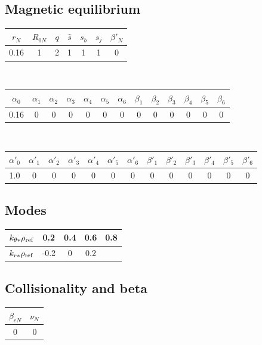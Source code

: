 \documentclass[fleqn]{report}
\begin{document}
\subsection{Magnetic equilibrium}
\begin{tabular}{c c c c c c c}
\hline
$r_N$ & $R_{0N}$ & $q$ & $\hat{s}$ & $s_b$ & $s_j$ & $\beta'_N$ \\ [0.5ex]
\hline
0.16 & 1 & 2 & 1 & 1 & 1 & 0 \\
\hline
\end{tabular}\\
\begin{tabular}{c c c c c c c c c c c c c}
\hline
$\alpha_0$ & $\alpha_1$ & $\alpha_2$ & $\alpha_3$ & $\alpha_4$ & $\alpha_5$ & $\alpha_6$ 
& $\beta_1$ & $\beta_2$ & $\beta_3$ & $\beta_4$ & $\beta_5$ & $\beta_6$   \\ [0.5ex]
\hline
 0.16 & 0 & 0 & 0 & 0 & 0 & 0 & 0 & 0 & 0 & 0 & 0 & 0 \\
\hline
\end{tabular}\\
\begin{tabular}{c c c c c c c c c c c c c}
\hline
$\alpha'_0$ & $\alpha'_1$ & $\alpha'_2$ & $\alpha'_3$ & $\alpha'_4$ & $\alpha'_5$ & $\alpha'_6$ 
& $\beta'_1$ & $\beta'_2$ & $\beta'_3$ & $\beta'_4$ & $\beta'_5$ & $\beta'_6$   \\ [0.5ex]
\hline
1.0 & 0 & 0 & 0 & 0 & 0  & 0 & 0 & 0 & 0  & 0 & 0 & 0 \\
\hline
\end{tabular}

\subsection{Modes}
\begin{tabular}{c c c c c}
\hline
$k_{\theta*}\rho_{\textrm{ref}}$ & 0.2 & 0.4 & 0.6 & 0.8 \\ [0.5ex]
\hline
$k_{r*}\rho_{\textrm{ref}}$ & -0.2 & 0  & 0.2  &  \\ [0.5ex]
\hline
\end{tabular}

\subsection{Collisionality and beta}
\begin{tabular}{c c}
\hline
 $\beta_{eN}$ & $\nu_N$ \\ [0.5ex]
\hline
0 & 0 \\ [0.5ex]
\hline
\end{tabular}
\end{document}
